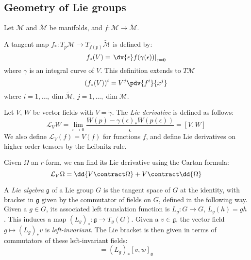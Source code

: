 \documentclass{jknotes}
\begin{document}
\subsection{Geometry of Lie groups}
Let \(\mathcal{M}\) and \(\tilde{\mathcal{M}}\) be manifolds, and \(f:\mathcal{M}\to\tilde{\mathcal{M}}\).
\begin{defn}
    A tangent map \(f_*:T_p\mathcal{M}\to T_{f(p)}\tilde{\mathcal{M}}\) is defined by:
    \begin{equation}
        f_*(V) = \left.\dv{\epsilon} f(\gamma(\epsilon))\right|_{\epsilon=0}
    \end{equation}
    where \(\gamma\) is an integral curve of \(V\). This definition extends to \(T\mathcal{M}\)
    \begin{equation}
        (f_*(V))^i = V^j\pdv{f^i}{x^j}
    \end{equation}
    where \(i = 1,\dots,\dim\tilde{\mathcal{M}}\), \(j=1,\dots,\dim\mathcal{M}\).
\end{defn}
\begin{defn}
    Let \(V\), \(W\) be vector fields with \(V = \dot{\gamma}\). The \emph{Lie derivative} is defined as follows:
    \begin{equation}
        \mathcal{L}_VW = \lim_{\epsilon\to0} \frac{W(p) - \gamma(\epsilon)_*W(p(\epsilon))}{\epsilon} = [V,W]
    \end{equation}
    We also define \(\mathcal{L}_V(f) = V(f)\) for functions \(f\), and define Lie derivatives on higher order tensors by the Leibnitz rule.
\end{defn}

Given \(\Omega\) an \(r\)-form, we can find its Lie derivative using the Cartan formula:
\begin{equation}
    \mathcal{L}_V\Omega = \dd{V\contract\Omega} + V\contract\dd{\Omega}
\end{equation}

\begin{defn}
    A \emph{Lie algebra} \(\mathfrak{g}\) of a Lie group \(G\) is the tangent space of \(G\) at the identity, with bracket in \(\mathfrak{g}\) given by the commutator of fields on \(G\), defined in the following way. 
    Given a \(g\in G\), its associated left translation function is \(L_g:G\to G\), \(L_g(h) = gh\). This induces a map \((L_g)_*:\mathfrak{g}\to T_g(G)\). Given a \(v\in \mathfrak{g}\), the vector field \(g\mapsto(L_g)_*v\) is \emph{left-invariant}. The Lie bracket is then given in terms of commutators of these left-invariant fields:
    \begin{equation}
        [(L_g)_*v,(L_g)_*w] = (L_g)_*[v,w]_{\mathfrak{g}}
    \end{equation}
\end{defn}
\end{document}
